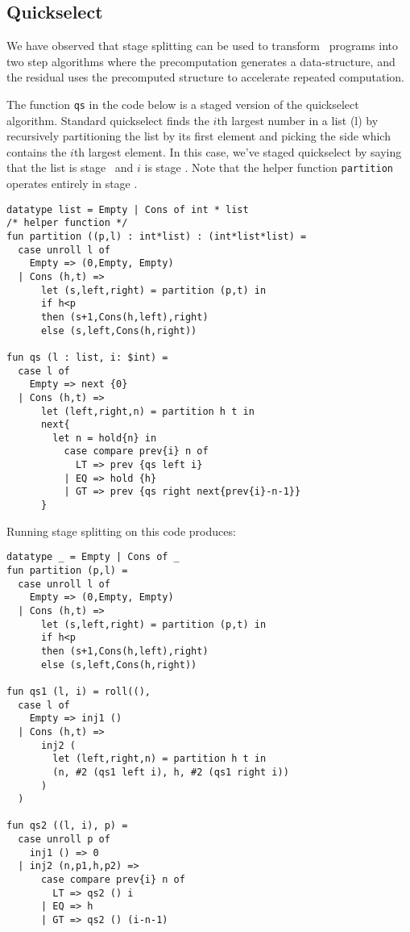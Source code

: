 \subsection{Quickselect}

We have observed that stage splitting can be used to transform \lang\ programs into two step algorithms where the precomputation generates a data-structure, and the residual uses the precomputed structure to accelerate repeated computation.  

The function {\tt qs} in the code below is a staged version of the quickselect algorithm.
Standard quickselect finds the $i$th largest number in a list (l) by recursively partitioning the list by its 
first element and picking the side which contains the $i$th largest element.
In this case, we've staged quickselect by saying that the list is stage \bbone\ and $i$ is stage \bbtwo.
Note that the helper function {\tt partition} operates entirely in stage \bbone.

\begin{lstlisting} 
datatype list = Empty | Cons of int * list
/* helper function */
fun partition ((p,l) : int*list) : (int*list*list) =
  case unroll l of 
    Empty => (0,Empty, Empty) 
  | Cons (h,t) =>
      let (s,left,right) = partition (p,t) in
      if h<p 
      then (s+1,Cons(h,left),right)
      else (s,left,Cons(h,right))

fun qs (l : list, i: $int) = 
  case l of
    Empty => next {0}
  | Cons (h,t) => 
      let (left,right,n) = partition h t in
      next{
        let n = hold{n} in
          case compare prev{i} n of
            LT => prev {qs left i}
          | EQ => hold {h}
          | GT => prev {qs right next{prev{i}-n-1}}
      }	
\end{lstlisting}

\noindent
Running stage splitting on this code produces:

\begin{lstlisting} 
datatype _ = Empty | Cons of _
fun partition (p,l) =
  case unroll l of 
    Empty => (0,Empty, Empty) 
  | Cons (h,t) =>
      let (s,left,right) = partition (p,t) in
      if h<p 
      then (s+1,Cons(h,left),right)
      else (s,left,Cons(h,right))

fun qs1 (l, i) = roll((), 
  case l of
    Empty => inj1 ()
  | Cons (h,t) => 
      inj2 (
        let (left,right,n) = partition h t in
        (n, #2 (qs1 left i), h, #2 (qs1 right i))
      )
  )

fun qs2 ((l, i), p) = 
  case unroll p of
    inj1 () => 0
  | inj2 (n,p1,h,p2) => 
      case compare prev{i} n of
        LT => qs2 () i
      | EQ => h
      | GT => qs2 () (i-n-1)
\end{lstlisting}

